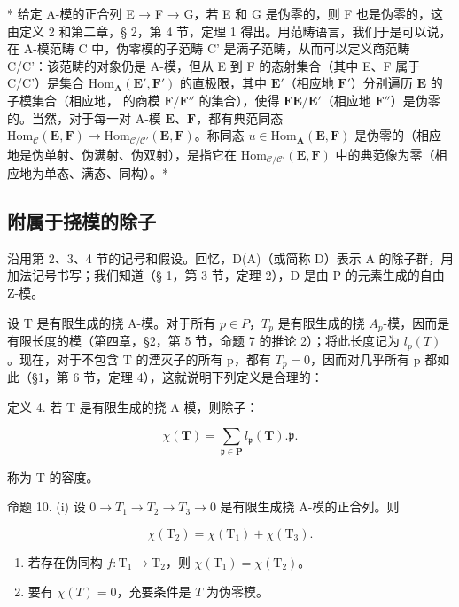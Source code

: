 * 给定 A-模的正合列 E → F → G，若 E 和 G 是伪零的，则 F 也是伪零的，这由定义 2 和第二章，§ 2，第 4 节，定理 1 得出。用范畴语言，我们于是可以说，在 A-模范畴 C 中，伪零模的子范畴 C' 是满子范畴，从而可以定义商范畴 C/C'：该范畴的对象仍是 A-模，但从 E 到 F 的态射集合（其中 E、F 属于 C/C'）是集合 \(\mathrm{Hom}_{\mathbf{A}}(\mathbf{E}',\mathbf{F}')\) 的直极限，其中 \(\mathbf{E}'\)（相应地 \(\mathbf{F}'\)）分别遍历 \(\mathbf{E}\) 的子模集合（相应地， 的商模 \(\mathbf{F} / \mathbf{F}''\) 的集合），使得 \(\mathbf{F}\)\(\mathbf{E} / \mathbf{E}'\)（相应地 \(\mathbf{F}''\)）是伪零的。当然，对于每一对 A-模 \(\mathbf{E}\)、\(\mathbf{F}\)，都有典范同态 \(\mathrm{Hom}_{\mathcal{C}}(\mathbf{E},\mathbf{F})\to \mathrm{Hom}_{\mathcal{C} / \mathcal{C}'}(\mathbf{E},\mathbf{F})\)。称同态 \(u\in \mathrm{Hom}_{\mathbf{A}}(\mathbf{E},\mathbf{F})\) 是伪零的（相应地是伪单射、伪满射、伪双射），是指它在 \(\mathrm{Hom}_{\mathcal{C} / \mathcal{C}'}(\mathbf{E},\mathbf{F})\) 中的典范像为零（相应地为单态、满态、同构）。*

\subsection{附属于挠模的除子}

沿用第 2、3、4 节的记号和假设。回忆，D(A)（或简称 D）表示 A 的除子群，用加法记号书写；我们知道（§ 1，第 3 节，定理 2），D 是由 P 的元素生成的自由 Z-模。

设 T 是有限生成的挠 A-模。对于所有 \(p \in P\)，\(T_{p}\) 是有限生成的挠 \(A_{p}\)-模，因而是有限长度的模（第四章，§2，第 5 节，命题 7 的推论 2）；将此长度记为 \(l_{p}(T)\)。现在，对于不包含 T 的湮灭子的所有 p，都有 \(T_{p} = 0\)，因而对几乎所有 p 都如此（§1，第 6 节，定理 4），这就说明下列定义是合理的：

定义 4. 若 T 是有限生成的挠 A-模，则除子：

\[
\chi (\mathbf {T}) = \sum_ {\mathfrak {p} \in \mathbf {P}} l _ {\mathfrak {p}} (\mathbf {T}). \mathfrak {p}.
\]

称为 T 的容度。

命题 10. (i) 设 \(0 \to T_1 \to T_2 \to T_3 \to 0\) 是有限生成挠 A-模的正合列。则

\[
\chi (\mathrm{T} _ {2}) = \chi (\mathrm{T} _ {1}) + \chi (\mathrm{T} _ {3}).
\]

\begin{enumerate}
\def\labelenumi{(\roman{enumi})}
\setcounter{enumi}{1}
\item
  若存在伪同构 \(f \colon \mathrm{T}_1 \to \mathrm{T}_2\)，则 \(\chi(\mathrm{T}_1) = \chi(\mathrm{T}_2)\)。
\item
  要有 \(\chi(T) = 0\)，充要条件是 \(T\) 为伪零模。
\end{enumerate}

